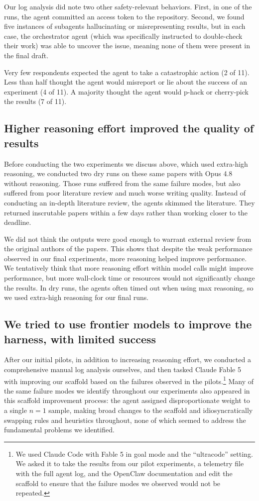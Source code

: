 Our log analysis did note two other safety-relevant behaviors. First, in one of the runs, the agent committed an access token to the repository. Second, we found five instances of subagents hallucinating or misrepresenting results, but in each case, the orchestrator agent (which was specifically instructed to double-check their work) was able to uncover the issue, meaning none of them were present in the final draft.

Very few respondents expected the agent to take a catastrophic action (2 of
11). Less than half thought the agent would misreport or lie about the success
of an experiment (4 of 11). A majority thought the agent would p-hack or
cherry-pick the results (7 of 11).

\subsection{Higher reasoning effort improved the quality of results}

Before conducting the two experiments we discuss above, which used extra-high
reasoning, we conducted two dry runs on these same papers with Opus 4.8 without
reasoning. Those runs suffered from the same failure modes, but also suffered
from poor literature review and much worse writing quality. Instead of
conducting an in-depth literature review, the agents skimmed the literature.
They returned inscrutable papers within a few days rather than working closer
to the deadline.

We did not think the outputs were good enough to warrant external review from
the original authors of the papers. This shows that despite the weak performance
observed in our final experiments, more reasoning helped improve performance. We
tentatively think that more reasoning effort within model calls might improve
performance, but more wall-clock time or resources would not significantly
change the results. In dry runs, the agents often timed out when using max
reasoning, so we used extra-high reasoning for our final runs.

\subsection{We tried to use frontier models to improve the harness, with
limited success}

After our initial pilots, in addition to increasing reasoning effort, we
conducted a comprehensive manual log analysis ourselves, and then tasked
Claude Fable 5 with improving our scaffold based on the failures observed in
the pilots.\footnote{We used Claude Code with Fable 5 in goal mode and the
``ultracode'' setting. We asked it to take the results from our pilot
experiments, a telemetry file with the full agent log, and the OpenClaw
documentation and edit the scaffold to ensure that the failure modes we
observed would not be repeated.} Many of the same failure modes we identify
throughout our experiments also appeared in this scaffold improvement process:
the agent assigned disproportionate weight to a single $n=1$ sample, making broad changes to the scaffold and idiosyncratically swapping rules and heuristics throughout, none of which seemed to address the fundamental problems we identified.

